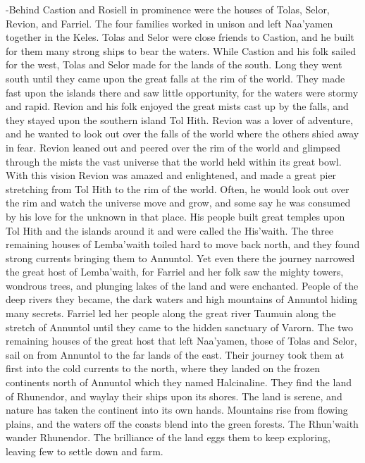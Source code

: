 \documentclass[smalldemyvopaper,11pt,twoside,onecolumn,openright,extrafontsizes]{memoir}
\begin{document}
{{-Behind Castion and Rosiell in prominence were the houses of Tolas, Selor, Revion, and Farriel. The four families worked in unison and left Naa’yamen together in the Keles. Tolas and Selor were close friends to Castion, and he built for them many strong ships to bear the waters. While Castion and his folk sailed for the west, Tolas and Selor made for the lands of the south. Long they went south until they came upon the great falls at the rim of the world. They made fast upon the islands there and saw little opportunity, for the waters were stormy and rapid. Revion and his folk enjoyed the great mists cast up by the falls, and they stayed upon the southern island Tol Hith. Revion was a lover of adventure, and he wanted to look out over the falls of the world where the others shied away in fear. Revion leaned out and peered over the rim of the world and glimpsed through the mists the vast universe that the world held within its great bowl. With this vision Revion was amazed and enlightened, and made a great pier stretching from Tol Hith to the rim of the world. Often, he would look out over the rim and watch the universe move and grow, and some say he was consumed by his love for the unknown in that place. His people built great temples upon Tol Hith and the islands around it and were called the His’waith. The three remaining houses of Lemba’waith toiled hard to move back north, and they found strong currents bringing them to Annuntol. Yet even there the journey narrowed the great host of Lemba’waith, for Farriel and her folk saw the mighty towers, wondrous trees, and plunging lakes of the land and were enchanted. People of the deep rivers they became, the dark waters and high mountains of Annuntol hiding many secrets. Farriel led her people along the great river Taumuin along the stretch of Annuntol until they came to the hidden sanctuary of Varorn.
The two remaining houses of the great host that left Naa’yamen, those of Tolas and Selor, sail on from Annuntol to the far lands of the east. Their journey took them at first into the cold currents to the north, where they landed on the frozen continents north of Annuntol which they named Halcinaline. They find the land of Rhunendor, and waylay their ships upon its shores. The land is serene, and nature has taken the continent into its own hands. Mountains rise from flowing plains, and the waters off the coasts blend into the green forests. The Rhun’waith wander Rhunendor. The brilliance of the land eggs them to keep exploring, leaving few to settle down and farm. 
}}
\end{document}
